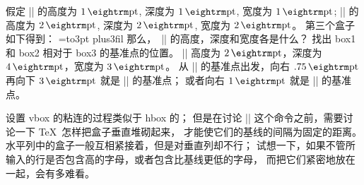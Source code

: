 \dangerexercise 假定 || 的高度为 $1\pt$, 深度为 $1\pt$, 宽度为 $1\pt$;
|| 的高度为 $2\pt$, 深度为 $2\pt$, 宽度为 $2\pt$。%
第三个盒子如下得到：
\begintt
{}=\hbox to3pt{\hfil{}\hskip-3pt plus3fil}
\endtt
那么，~|| 的高度，深度和宽度各是什么？
找出 box1 和 box2 相对于 box3 的基准点的位置。
\answer || 高度为 $2\pt$，深度为 $4\pt$，宽度为 $3\pt$。
从 || 的基准点出发，向右 $.75\pt$ 再向下 $3\pt$ 就是 || 的基准点；
或者向右 $1\pt$ 就是 || 的基准点。

\danger \1设置 vbox 的粘连的过程类似于 hbox 的；
但是在讨论 |\vbox| 这个命令之前，需要讨论一下 \TeX\ 怎样把盒子垂直堆砌起来，
才能使它们的基线的间隔为固定的距离。%
水平列中的盒子一般互相紧接着，但是对垂直列却不行；
试想一下，如果不管所输入的行是否包含高的字母，或者包含比基线更低的字母，
而把它们紧密地放在一起，会有多难看。

